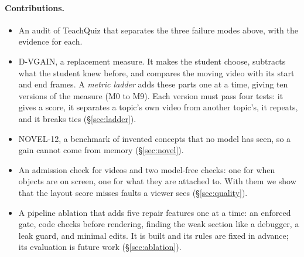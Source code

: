 \paragraph{Contributions.}
\begin{itemize}
  \item An audit of TeachQuiz that separates the three failure modes above, with the evidence for each.
  \item D-VGAIN, a replacement measure. It makes the student choose, subtracts what the student knew before, and
  compares the moving video with its start and end frames. A \emph{metric ladder} adds these parts one at a time, giving ten
  versions of the measure (M0 to M9). Each version must pass four tests: it gives a score, it separates a topic's own video from another topic's, it repeats, and it
  breaks ties (\S\ref{sec:ladder}).
  \item NOVEL-12, a benchmark of invented concepts that no model has seen, so a gain cannot come from memory
  (\S\ref{sec:novel}).
  \item An admission check for videos and two model-free checks: one for when objects are on screen, one for what
  they are attached to. With them we show that the layout score misses faults a viewer sees (\S\ref{sec:quality}).
  \item A pipeline ablation that adds five repair features one at a time: an enforced gate, code checks before
  rendering, finding the weak section like a debugger, a leak guard, and minimal edits. It is built and its rules are
  fixed in advance; its evaluation is future work (\S\ref{sec:ablation}).
\end{itemize}
